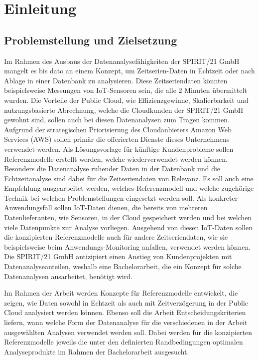 \chapter{Einleitung}

\section{Problemstellung und Zielsetzung}
Im Rahmen des Ausbaus der Datenanalysefähigkeiten der SPIRIT/21 GmbH mangelt es bis dato an einem Konzept, um
Zeitserien-Daten in Echtzeit oder nach Ablage in einer Datenbank zu analysieren. 
Diese Zeitseriendaten könnten beispielsweise Messungen von IoT-Sensoren sein, die alle 2 Minuten übermittelt wurden. Die Vorteile der Public Cloud, wie Effizienzgewinne, Skalierbarkeit und nutzungsbasierte Abrechnung, welche die Cloudkunden der SPIRIT/21 GmbH gewohnt sind, sollen auch bei diesen Datenanalysen zum Tragen kommen. 
Aufgrund der strategischen Priorisierung des Cloudanbieters Amazon Web Services (AWS) sollen primär die offerierten Dienste dieses Unternehmens verwendet werden.
Als Lösungsvorlage für künftige Kundenprobleme sollen Referenzmodelle erstellt werden, welche wiederverwendet werden
können. Besonders die Datenanalyse ruhender Daten in der Datenbank und die Echtzeitanalyse sind dabei für die
Zeitseriendaten von Relevanz. Es soll auch eine Empfehlung ausgearbeitet werden, welches Referenzmodell und welche
zugehörige Technik bei welchen Problemstellungen eingesetzt werden soll. Als konkreter Anwendungsfall sollen IoT-Daten dienen, die bereits von mehreren Datenlieferanten, wie Sensoren, in der Cloud gespeichert werden und bei welchen viele Datenpunkte zur Analyse vorliegen. Ausgehend von diesen IoT-Daten sollen die konzipierten Referenzmodelle auch für andere Zeitseriendaten, wie sie beispielsweise beim Anwendungs-Monitoring anfallen, verwendet werden können. 
Die SPIRIT/21 GmbH antizipiert einen Anstieg von Kundenprojekten mit Datenanalyseanteilen, weshalb eine Bachelorarbeit, die ein Konzept für solche Datenanalysen ausarbeitet, benötigt wird.

Im Rahmen der Arbeit werden Konzepte für Referenzmodelle entwickelt, die zeigen, wie Daten sowohl in Echtzeit als auch mit Zeitverzögerung in der Public Cloud analysiert werden können. 
Ebenso soll die Arbeit Entscheidungskriterien liefern, wann welche Form der Datenanalyse für die verschiedenen in der Arbeit ausgewählten Analysen verwendet werden soll. 
Dabei werden für die konzipierten Referenzmodelle jeweils die unter den definierten Randbedingungen optimalen Analyseprodukte im Rahmen der Bachelorarbeit ausgesucht.

